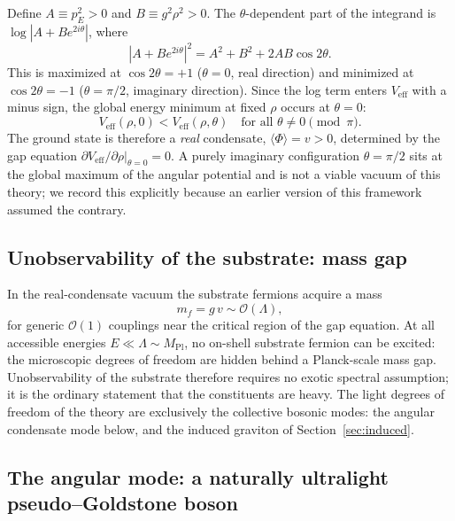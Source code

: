 \documentclass[11pt,a4paper]{article}
\begin{document}
Define $A \equiv p_E^2 > 0$ and $B \equiv g^2\rho^2 > 0$.
The $\theta$-dependent part of the integrand is
$\log|A + Be^{2i\theta}|$, where
\begin{equation}
|A + Be^{2i\theta}|^2 = A^2 + B^2 + 2AB\cos 2\theta.
\label{eq:modulus}
\end{equation}
This is maximized at $\cos 2\theta = +1$ ($\theta = 0$, real
direction) and minimized at $\cos 2\theta = -1$
($\theta = \pi/2$, imaginary direction).
Since the log term enters $V_{\mathrm{eff}}$ with a minus sign,
the global energy minimum at fixed $\rho$ occurs at $\theta = 0$:
\begin{equation}
V_{\mathrm{eff}}(\rho, 0) < V_{\mathrm{eff}}(\rho, \theta)
\quad \text{for all } \theta \neq 0 \pmod{\pi}.
\label{eq:real-minimum}
\end{equation}
The ground state is therefore a \emph{real} condensate,
$\langle\Phi\rangle = v > 0$, determined by the gap equation
$\partial V_{\mathrm{eff}}/\partial\rho|_{\theta=0} = 0$.
A purely imaginary configuration $\theta = \pi/2$ sits at the
global maximum of the angular potential and is not a viable vacuum
of this theory; we record this explicitly because an earlier
version of this framework assumed the contrary.

\subsection{Unobservability of the substrate: mass gap}
\label{sec:gap}

In the real-condensate vacuum the substrate fermions acquire a mass
\begin{equation}
m_f = g\,v \sim \mathcal{O}(\Lambda),
\label{eq:mf}
\end{equation}
for generic $\mathcal{O}(1)$ couplings near the critical region of
the gap equation.
At all accessible energies $E \ll \Lambda \sim M_{\mathrm{Pl}}$,
no on-shell substrate fermion can be excited: the microscopic
degrees of freedom are hidden behind a Planck-scale mass gap.
Unobservability of the substrate therefore requires no exotic
spectral assumption; it is the ordinary statement that the
constituents are heavy.
The light degrees of freedom of the theory are exclusively the
collective bosonic modes: the angular condensate mode below, and
the induced graviton of Section~\ref{sec:induced}.

\subsection{The angular mode: a naturally ultralight
pseudo--Goldstone boson}
\label{sec:angular}
\end{document}
